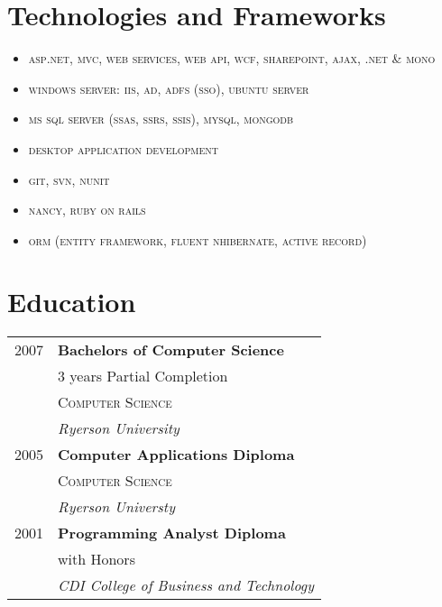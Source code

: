 \documentclass[9pt]{article} %
\begin{document}
{\begin{minipage}[t]{0.44\textwidth}
\section{Technologies and Frameworks} 
\begin{itemize} \itemsep1pt \parskip0pt 
\item \textsc{asp.net, mvc, web services, web api, wcf, sharepoint, ajax, .net \& mono}
\item \textsc{windows server: iis, ad, adfs (sso), ubuntu server}
\item \textsc{ms sql server (ssas, ssrs, ssis), mysql, mongodb}
\item \textsc{desktop application development}
\item \textsc{git, svn, nunit}
\item \textsc{nancy, ruby on rails}
\item \textsc{orm (entity framework, fluent nhibernate, active record)}
\end{itemize}


\section{Education} 

\begin{tabular}{rl} %

2007 & \textbf{Bachelors of Computer Science} \\ 
& \small 3 years Partial Completion \\
& \textsc{Computer Science} \\ 
& \textit{Ryerson University}\\
2005 & \textbf{Computer Applications Diploma}\\
& \textsc{Computer Science} \\
& \textit{Ryerson Universty}\\ 
2001 & \textbf{Programming Analyst Diploma}\\
& \small with Honors \\
& \textit{CDI College of Business and Technology}\\


\end{tabular}
\end{minipage}}
\end{document}
